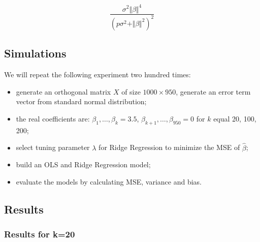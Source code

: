 \documentclass[
]{article}
\begin{document}
\[\frac {\sigma^2 \Vert\beta\Vert^4} {(p\sigma^2 + \Vert\beta\Vert^2)^2}\]

\hypertarget{simulations}{%
\subsection{Simulations}\label{simulations}}

We will repeat the following experiment two hundred times:

\begin{itemize}
\item
  generate an orthogonal matrix \(X\) of size \(1000 \times 950\),
  generate an error term vector from standard normal distribution;
\item
  the real coefficients are: \(\beta_1, \ldots, \beta_k = 3.5\),
  \(\beta_{k+1}, \ldots, \beta_{950} = 0\) for \(k\) equal 20, 100, 200;
\item
  select tuning parameter \(\lambda\) for Ridge Regression to minimize
  the MSE of \(\hat\beta\);
\item
  build an OLS and Ridge Regression model;
\item
  evaluate the models by calculating MSE, variance and bias.
\end{itemize}

\hypertarget{results}{%
\subsection{Results}\label{results}}

\hypertarget{results-for-k20}{%
\subsubsection{Results for k=20}\label{results-for-k20}}
\end{document}
